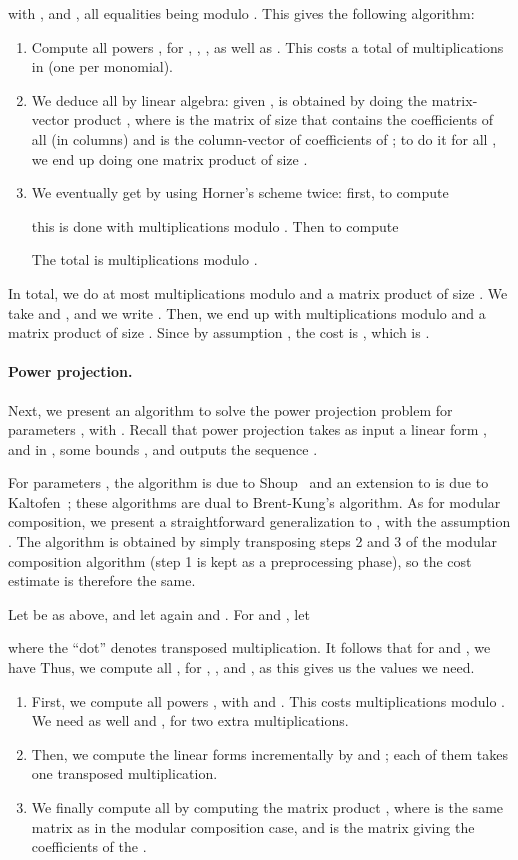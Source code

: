 \documentclass[12pt]{article}
\begin{document}
with ,  and , all
equalities being modulo . This gives the
following algorithm:
\begin{enumerate}
\item Compute all powers , for , ,
  , as well as . This costs a total of
   multiplications in  (one per
  monomial).
\item We deduce all  by linear algebra: given
  ,  is obtained by doing the matrix-vector product , where  is the matrix of size  that contains the coefficients of
  all  (in columns) and
   is the column-vector of coefficients of ;
  to do it for all , we end up doing one matrix product of
  size .
\item We eventually get  by
  using Horner's scheme twice: first, to compute
  
  this is done with  multiplications modulo . Then to compute
  
  The total is  multiplications modulo
  .
\end{enumerate}
In total, we do at most  multiplications modulo  and a
matrix product of size .  We take  and , and we write .
Then, we end up with  multiplications modulo
 and a matrix product of size .  Since by
assumption , the cost is
, which
is .

\paragraph{Power projection.} 
Next, we present an algorithm to solve the power projection problem
for parameters , with . Recall that power projection takes
as input a linear form ,  and  in ,
some bounds , and outputs the sequence
.

For parameters , the algorithm is due to
Shoup~\cite{Shoup99} and an extension to  is due to
Kaltofen~\cite{Kaltofen00}; these algorithms are dual to Brent-Kung's
algorithm. As for modular composition, we present a straightforward
generalization to , with the assumption . The algorithm is obtained by simply transposing steps 2
and 3 of the modular composition algorithm (step 1 is kept as a
preprocessing phase), so the cost estimate is therefore the same.

Let  be as
above, and let again  and . For  and , let

where the ``dot'' denotes transposed multiplication. It follows that
for  and , we have
 Thus, we compute all , for , ,  and , as this gives us the values we need.
\begin{enumerate}
\item First, we compute all powers , with  and . This costs 
  multiplications modulo .  We need as well
   and , for two extra multiplications.
\item Then, we compute the linear forms  incrementally
  by  and
  ; each of them
  takes one transposed multiplication.
\item We finally compute all  by computing the matrix product ,
  where  is the same  matrix as in the modular composition case, and
   is the  matrix giving the coefficients of the
  .
\end{enumerate}
\end{document}
